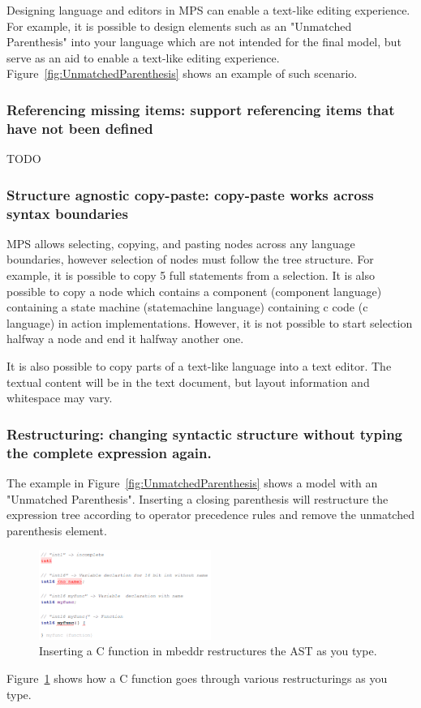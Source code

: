 \documentclass[preprint,numbers,10pt]{sigplanconf}
\begin{document}
Designing language and editors in MPS can enable a text-like editing experience. For example,
 it is possible to design elements such as an "Unmatched Parenthesis" into your language which are not intended for the final model, but serve as an aid to enable a text-like editing experience.
 Figure~\ref{fig:UnmatchedParenthesis} shows an example of such scenario.


\subsubsection{Referencing missing items: support referencing items that have not been defined}
TODO

\subsubsection{Structure agnostic copy-paste: copy-paste works across syntax boundaries}
MPS allows selecting, copying, and pasting nodes across any language boundaries, however selection of nodes must follow the tree structure. For example, it is possible to copy 5 full statements from a selection. It is also possible to copy a node which contains a component (component language) containing a state machine (statemachine language) containing c code (c language) in action implementations. However, it is not possible to start selection halfway a node and end it halfway another one.

It is also possible to copy parts of a text-like language into a text editor. The textual content will be in the text document, but layout information and whitespace may vary.

\subsubsection{Restructuring: changing syntactic structure without typing the complete expression again.}
The example in Figure~\ref{fig:UnmatchedParenthesis} shows a model with an "Unmatched Parenthesis". Inserting a closing parenthesis will restructure the expression tree according to operator precedence rules and remove the unmatched parenthesis element.

\begin{figure}[H]
	\centering
	\includegraphics[width=0.5\textwidth]{screens/TypeAndRestructure.png}
	\caption{Inserting a C function in mbeddr restructures the AST as you type.}
	\label{fig:TypeAndRestructure}
\end{figure}
Figure~\ref{fig:TypeAndRestructure} shows how a C function goes through various restructurings as you type.
\end{document}
